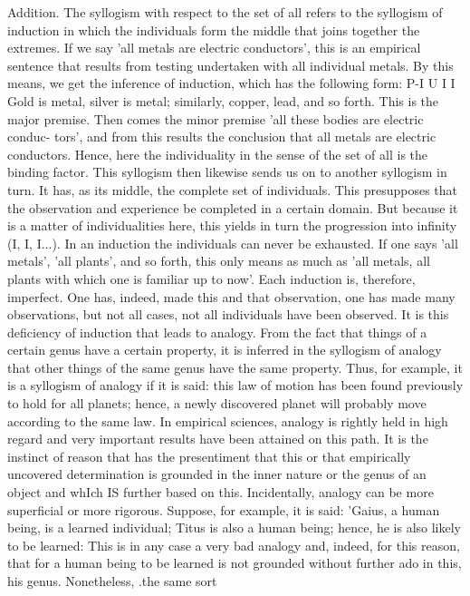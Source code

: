 Addition. The syllogism with respect to the set of all refers to the syllogism
of induction in which the individuals form the middle that joins together the extremes.
If we say 'all metals are electric conductors', this is an empirical sentence
that results from testing undertaken with all individual metals. By this means, we
get the inference of induction, which has the following form: P-I U I I
Gold is metal, silver is metal; similarly, copper, lead, and so forth. This is the
major premise. Then comes the minor premise 'all these bodies are electric conduc-
tors', and from this results the conclusion that all metals are electric conductors.
Hence, here the individuality in the sense of the set of all is the binding factor.
This syllogism then likewise sends us on to another syllogism in turn. It has, as
its middle, the complete set of individuals. This presupposes that the observation
and experience be completed in a certain domain. But because it is a matter of
individualities here, this yields in turn the progression into infinity (I, I, I...).
In an induction the individuals can never be exhausted. If one says
'all metals', 'all plants', and so forth, this only means as much as 'all metals, all plants
with which one is familiar up to now'. Each induction is, therefore, imperfect.
One has, indeed, made this and that observation, one has made many observations,
but not all cases, not all individuals have been observed. It is this deficiency of
induction that leads to analogy. From the fact that things of a certain genus have a
certain property, it is inferred in the syllogism of analogy that other things of the
same genus have the same property. Thus, for example, it is a syllogism of analogy
if it is said: this law of motion has been found previously to hold for all planets;
hence, a newly discovered planet will probably move according to the same law.
In empirical sciences, analogy is rightly held in high regard and very important
results have been attained on this path. It is the instinct of reason that has the
presentiment that this or that empirically uncovered determination is grounded in
the inner nature or the genus of an object and whIch IS further based on this.
Incidentally, analogy can be more superficial or more rigorous. Suppose,
for example, it is said: 'Gaius, a human being, is a learned individual; Titus is also
a human being; hence, he is also likely to be learned: This is in any case a very
bad analogy and, indeed, for this reason, that for a human being to be learned is
not grounded without further ado in this, his genus. Nonetheless, .the same sort
